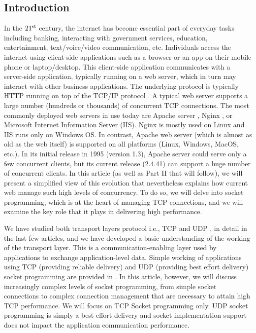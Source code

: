 \begin{multicols}{2}

\section{Introduction}
 
 In the $21^{\rm st}$ century, the internet has become essential part of everyday tasks including banking, interacting with government services, education, entertainment, text/voice/video communication, etc. Individuals access the internet using client-side applications such as a browser or an app on their mobile phone or laptop/desktop. This client-side application communicates with a server-side application, typically running on a web server, which in turn may interact with other business applications. The underlying protocol is typically HTTP \cite{art1-key01} running on top of the TCP/IP protocol \cite{art1-key02}\cite{art1-key03}. A typical web server supports a large number (hundreds or thousands) of concurrent TCP connections. The most commonly deployed web servers in use today are Apache server \cite{art1-key04}, Nginx \cite{art1-key05}, or Microsoft Internet Information Server (IIS)\cite{art1-key06}. Nginx is mostly used on Linux and IIS runs only on Windows OS. In contrast, Apache web server (which is almost as old as the web itself) is supported on all platforms (Linux, Windows, MacOS, etc.). In its initial release in 1995 (version 1.3), Apache server could serve only a few concurrent clients, but its current release (2.4.41) can support a huge number of concurrent clients. In this article (as well as Part II that will follow), we will present a simplified view of this evolution that nevertheless explains how current web manage such high levels of concurrency. To do so, we will delve into socket programming, which is at the heart of managing TCP connections, and we will examine the key role that it plays in delivering high performance.

We have studied both transport layers protocol i.e., TCP \cite{art1-key02} and UDP \cite{art1-key07}, in detail in the last few articles, and we have developed a basic understanding of the working of the transport layer. This is a communication-enabling layer used by applications to exchange application-level data. Simple working of applications using TCP (providing reliable delivery) and UDP (providing best effort delivery) socket programming are provided in \cite{art1-key08}.  In this article, however, we will discuss increasingly complex levels of socket programming, from simple socket connections to complex connection management that are necessary to attain high TCP performance.  We will focus on TCP Socket programming only. UDP socket programming is simply a best effort delivery and socket implementation support does not impact the application communication performance. 


\end{multicols}
